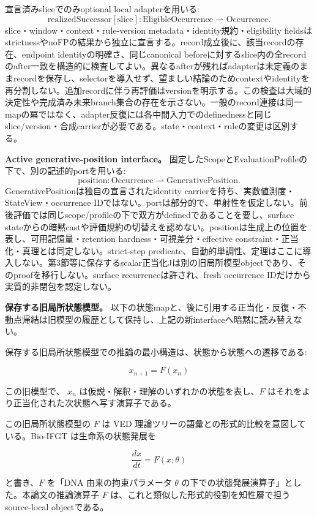 宣言済みsliceでのみoptional local adapterを用いる:
\[
\mathrm{realizedSuccessor}[\mathrm{slice}]:\mathrm{EligibleOccurrence}\rightharpoonup\mathrm{Occurrence}.
\]
slice・window・context・rule-version metadata・identity規約・eligibility fieldsはstrictnessやnoFPの結果から独立に宣言する。record成立後に、該当recordの存在、endpoint identityの明確さ、同じcanonical beforeに対するslice内の全recordのafter一致を構造的に検査してよい。異なるafterが残ればadapterは未定義のままrecordを保存し、selectorを導入せず、望ましい結論のためcontextやidentityを再分割しない。追加recordに伴う再評価はversionを明示する。この検査は大域的決定性や完成済み未来branch集合の存在を示さない。一般のrecord連接は同一mapの冪ではなく、adapter反復には各中間入力でのdefinednessと同じslice/version・合成carrierが必要である。state・context・ruleの変更は区別する。

\noindent\textbf{Active generative-position interface。} 固定したScopeとEvaluationProfileの下で、別の記述的portを用いる:
\[
\mathrm{position}:\mathrm{Occurrence}\rightharpoonup\mathrm{GenerativePosition}.
\]
GenerativePositionは独自の宣言されたidentity carrierを持ち、実数値測度・StateView・occurrence IDではない。portは部分的で、単射性を仮定しない。前後評価では同じscope/profileの下で双方がdefinedであることを要し、surface stateからの暗黙castや評価規約の切替えを認めない。positionは生成上の位置を表し、可用記憶量・retention hardness・可視差分・effective constraint・正当化・真理とは同定しない。strict-step predicate、自動的単調性、定理はここに導入しない。第3節等に保存するscalar正当化Jは別の旧局所模型objectであり、そのproofを移行しない。surface recurrenceは許され、fresh occurrence IDだけから実質的非閉包を認定しない。

\noindent\textbf{保存する旧局所状態模型。} 以下の状態mapと、後に引用する正当化・反復・不動点帰結は旧模型の履歴として保持し、上記の新interfaceへ暗黙に読み替えない。

保存する旧局所状態模型での推論の最小構造は、状態から状態への遷移である:

\[
x_{n+1} = F(x_n)
\]

この旧模型で、 $x_n$ は仮説・解釈・理解のいずれかの状態を表し、$F$ はそれをより正当化された次状態へ写す演算子である。

この旧局所状態模型の $F$ は VED 理論ツリーの語彙との形式的比較を意図している。Bio-IFGT は生命系の状態発展を

\[
\frac{dx}{dt} = F(x;\theta)
\]

と書き、$F$ を「DNA 由来の拘束パラメータ $\theta$ の下での状態発展演算子」とした。本論文の推論演算子 $F$ は、これと類似した形式的役割を知性層で担うsource-local objectである。

